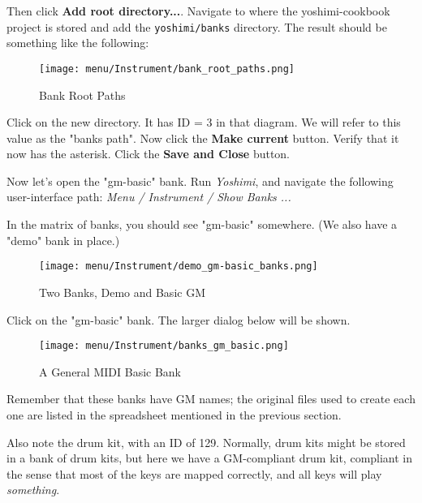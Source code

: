    Then click \textbf{Add root directory...}.  Navigate to where the
   yoshimi-cookbook project is stored and add the \texttt{yoshimi/banks}
   directory.  The result should be something like the following:

\begin{figure}[H]
   \centering 
   \texttt{[image: menu/Instrument/bank\_root\_paths.png]}
   \caption{Bank Root Paths}
   \label{fig:cookbook_bank_root_paths}
\end{figure}

   Click on the new directory.
   It has ID = 3 in that diagram.  We will refer to this value as
   the "banks path".
   Now click the \textbf{Make current} button.
   Verify that it now has the asterisk. 
   Click the \textbf{Save and Close} button.

   Now let's open the "gm-basic" bank.
   Run \textsl{Yoshimi}, and navigate the following user-interface path:
   \textsl{Menu / Instrument / Show Banks ...}

   In the matrix of banks, you should see "gm-basic" somewhere.
   (We also have a "demo" bank in place.)

\begin{figure}[H]
   \centering 
   \texttt{[image: menu/Instrument/demo\_gm-basic\_banks.png]}
   \caption{Two Banks, Demo and Basic GM}
   \label{fig:cookbook_bank_demo_gm_basic}
\end{figure}
   
   Click on the "gm-basic" bank.  The larger dialog below will be shown.

\begin{figure}[H]
   \centering 
   \texttt{[image: menu/Instrument/banks\_gm\_basic.png]}
   \caption{A General MIDI Basic Bank}
   \label{fig:cookbook_bank_basic_bank}
\end{figure}

   Remember that these banks have GM names; the original files used to
   create each one are listed in the spreadsheet mentioned in the previous
   section.

   Also note the drum kit, with an ID of 129.  Normally, drum kits might be
   stored in a bank of drum kits, but here we have a GM-compliant drum kit,
   compliant in the sense that most of the keys are mapped correctly, and
   all keys will play \textsl{something}.

